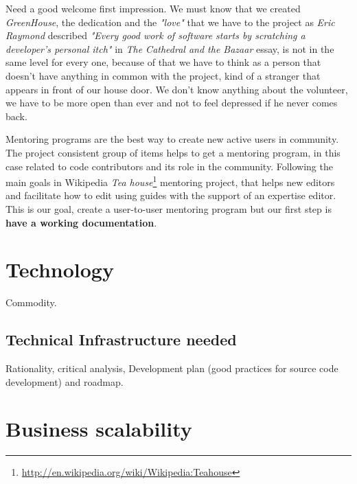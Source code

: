 \documentclass[11pt]{scrartcl}
\begin{document}
\par Need a good welcome first impression. We must know that we created \emph{GreenHouse}, the dedication and the \emph{"love"} that we have to the project as \emph{Eric Raymond} described \emph{"Every good work of software starts by scratching a developer's personal itch"} in \emph{The Cathedral and the Bazaar} essay\cite{cath-bazaar}, is not in the same level for every one, because of that we have to think as a person that doesn't have anything in common with the project, kind of a stranger that appears in front of our house door. We don't know anything about the volunteer, we have to be more open than ever and not to feel depressed if he never comes back.

\par Mentoring programs are the best way to create new active users in community. The project consistent group of items helps to get a mentoring program, in this case related to code contributors and its role in the community. Following the main goals in Wikipedia \emph{Tea house}\footnote{\url{http://en.wikipedia.org/wiki/Wikipedia:Teahouse}} mentoring project, that helps new editors and facilitate how to edit using guides with the support of an expertise editor. This is our goal, create a user-to-user mentoring program but our first step is \textbf{have a working documentation}.



\section{Technology}
\label{sec:technology}

\par Commodity.


\subsection{Technical Infrastructure needed}
\label{sub:infrastructure}

\par Rationality, critical analysis, Development plan (good practices for source code development) and roadmap.


\section{Business scalability}
\label{sec:scalability}
\end{document}

